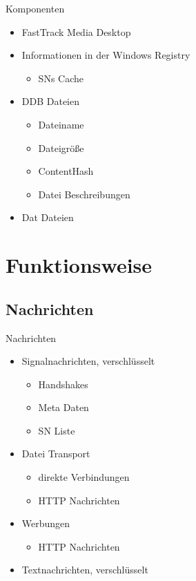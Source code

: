 \documentclass[ucs,9pt]{beamer}
\begin{document}
\begin{frame}{Komponenten}
\begin{itemize}
	\item FastTrack Media Desktop
	\item Informationen in der Windows Registry
		\begin{itemize}
		\item SNs Cache
		\end{itemize}
	\item DDB Dateien
		\begin{itemize}
		\item Dateiname
		\item Dateigröße
		\item ContentHash
		\item Datei Beschreibungen
		\end{itemize}
	\item Dat Dateien
\end{itemize}
\end{frame}

\section{Funktionsweise}

\subsection{Nachrichten}

\begin{frame}{Nachrichten}
\begin{itemize}
\item Signalnachrichten, verschlüsselt
	\begin{itemize}
	\item Handshakes
	\item Meta Daten
	\item SN Liste
	\end{itemize}
\item Datei Transport
	\begin{itemize}
	\item direkte Verbindungen
	\item HTTP Nachrichten
	\end{itemize}
\item Werbungen
	\begin{itemize}
	\item HTTP Nachrichten
	\end{itemize}
\item Textnachrichten, verschlüsselt
\end{itemize}
\end{frame}
\end{document}
